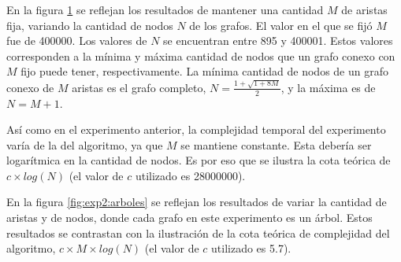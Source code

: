     \renewcommand\constante{28000000}

    En la figura \ref{fig:exp2:m_fijo} se reflejan los resultados de mantener una cantidad $M$ de aristas fija, variando la cantidad de nodos $N$ de los grafos. El valor en el que se fijó $M$ fue de 400000. Los valores de $N$ se encuentran entre 895 y 400001. Estos valores corresponden a la mínima y máxima cantidad de nodos que un grafo conexo con $M$ fijo puede tener, respectivamente. La mínima cantidad de nodos de un grafo conexo de $M$ aristas es el grafo completo, $N = \frac{1 + \sqrt{1 + 8M}}{2}$, y la máxima es de $N = M + 1$.

    Así como en el experimento anterior, la complejidad temporal del experimento varía de la del algoritmo, ya que $M$ se mantiene constante. Esta debería ser logarítmica en la cantidad de nodos. Es por eso que se ilustra la cota teórica de $c \times log(N)$ (el valor de $c$ utilizado es \constante). 
    
    \begin{figure}[H]
        \centering
        \caption{}
        \label{fig:exp2:m_fijo}
    \end{figure}

    \renewcommand\constante{5.7}

    En la figura \ref{fig:exp2:arboles} se reflejan los resultados de variar la cantidad de aristas y de nodos, donde cada grafo en este experimento es un árbol. Estos resultados se contrastan con la ilustración de la cota teórica de complejidad del algoritmo, $c \times M \times log(N)$ (el valor de $c$ utilizado es \constante).

